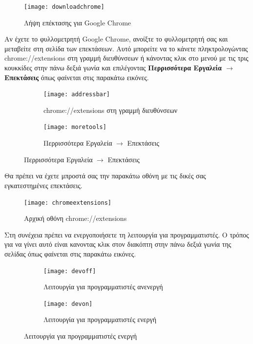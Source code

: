 \documentclass{article}
\begin{document}
\begin{figure}[H]
    \centering
    \texttt{[image: downloadchrome]}
    \caption*{Λήψη επέκτασης για Google Chrome}
\end{figure}

Αν έχετε το φυλλομετρητή Google Chrome, ανοίξτε το φυλλομετρητή σας και μεταβείτε στη σελίδα των επεκτάσεων. Αυτό μπορείτε να το κάνετε πληκτρολογώντας chrome://extensions στη γραμμή διευθύνσεων ή κάνοντας κλικ στο μενού με τις τρις κουκκίδες στην πάνω δεξιά γωνία και επιλέγοντας \textbf{Περρισσότερα Εργαλεία $\rightarrow$ Επεκτάσεις} όπως φαίνεται στις παρακάτω εικόνες. 

\begin{figure}[H]
    \centering
    \begin{minipage}[t]{0.45\textwidth}
        \centering
        \begin{subfigure}[t]{\textwidth}
            \texttt{[image: addressbar]}
            \caption{chrome://extensions στη γραμμή διευθύνσεων}
            \label{Fig:addressbar}
        \end{subfigure}
        \vspace{\fill}
    \end{minipage}
    \hfill
    \begin{minipage}{0.45\textwidth}
        \begin{subfigure}{\textwidth}
            \texttt{[image: moretools]}
            \caption{Περρισσότερα Εργαλεία $\rightarrow$ Επεκτάσεις}
            \label{Fig:moretools}
        \end{subfigure}
    \end{minipage}
\end{figure}

Θα πρέπει να έχετε μπροστά σας την παρακάτω οθόνη με τις δικές σας εγκατεστημένες επεκτάσεις.

\begin{figure}[H]
    \texttt{[image: chromeextensions]}
    \caption*{Αρχική οθόνη chrome://extensions}
\end{figure}

Στη συνέχεια πρέπει να ενεργοποιήσετε τη λειτουργία για προγραμματιστές. Ο τρόπος για να γίνει αυτό είναι κανοντας κλικ στον διακόπτη στην πάνω δεξιά γωνία της σελίδας όπως φαίνεται στις παρακάτω εικόνες.
\begin{figure}[H]
    \centering
    \begin{subfigure}{0.45\textwidth}
        \texttt{[image: devoff]}
        \caption{Λειτουργία για προγραμματιστές ανενεργή}
        \label{Fig:devoff}
    \end{subfigure}
    \hfill
    \begin{subfigure}{0.45\textwidth}
        \texttt{[image: devon]}
        \caption{Λειτουργία για προγραμματιστές ενεργή}
        \label{Fig:devon}
    \end{subfigure}
\end{figure}
\end{document}
